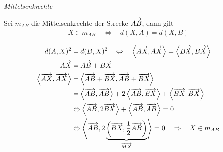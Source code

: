 \begin{mylemma}\textit{Mittelsenkrechte}\medskip

    \begin{minipage}{0.6\textwidth}
        Sei $m_{AB}$ die Mittelsenkrechte der Strecke $\overrightarrow{AB}$, dann gilt
        \begin{align*}
            X \in m_{AB} \quad \Leftrightarrow \quad d(X,A) = d(X,B)
        \end{align*}
    \end{minipage}
    \begin{minipage}{0.4\textwidth}
        \begin{center}
        \end{center}
    \end{minipage}
    \begin{align*}
        d(A,X)^2 & = d(B,X)^2 \quad \Leftrightarrow \quad \left\langle \overrightarrow{AX}, \overrightarrow{AX} \right\rangle = \left\langle \overrightarrow{BX}, \overrightarrow{BX} \right\rangle\\
        \overrightarrow{AX} & = \overrightarrow{AB} + \overrightarrow{BX}\\
        \left\langle \overrightarrow{AX}, \overrightarrow{AX} \right\rangle & = \left\langle \overrightarrow{AB} + \overrightarrow{BX}, \overrightarrow{AB} + \overrightarrow{BX} \right\rangle\\
        & = \left\langle \overrightarrow{AB}, \overrightarrow{AB} \right\rangle + 2 \left\langle \overrightarrow{AB}, \overrightarrow{BX} \right\rangle + \left\langle \overrightarrow{BX}, \overrightarrow{BX} \right\rangle\\
        & \Leftrightarrow \left\langle \overrightarrow{AB}, 2 \overrightarrow{BX} \right\rangle + \left\langle \overrightarrow{AB}, \overrightarrow{AB} \right\rangle = 0\\
        & \Leftrightarrow \left\langle \overrightarrow{AB}, 2 \underbrace{\left( \overrightarrow{BX}, \frac{1}{2} \overrightarrow{AB} \right)}_{\overrightarrow{MX}} \right\rangle = 0 \quad \Rightarrow \quad X \in m_{AB}
    \end{align*}
\end{mylemma}
